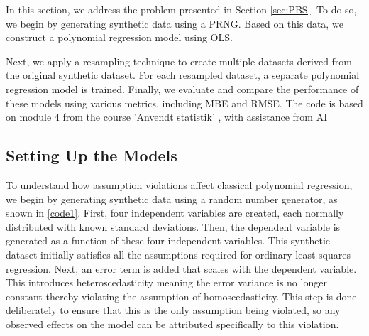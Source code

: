 


In this section, we address the problem presented in Section \ref{sec:PBS}. To do so, we begin by generating synthetic data using a PRNG. Based on this data, we construct a polynomial regression model using OLS.

\noindent Next, we apply a resampling technique to create multiple datasets derived from the original synthetic dataset. For each resampled dataset, a separate polynomial regression model is trained. Finally, we evaluate and compare the performance of these models using various metrics, including MBE and RMSE. The code is based on module 4 from the course 'Anvendt statistik' \cite{ASTA}, with assistance from AI 

\subsection{Setting Up the Models}
To understand how assumption violations affect classical polynomial regression, we begin by generating synthetic data using a random number generator, as shown in \autoref{code1}. First, four independent variables are created, each normally distributed with known standard deviations. Then, the dependent variable is generated as a function of these four independent variables. This synthetic dataset initially satisfies all the assumptions required for ordinary least squares regression. Next, an error term is added that scales with the dependent variable. This introduces heteroscedasticity meaning the error variance is no longer constant thereby violating the assumption of homoscedasticity. This step is done deliberately to ensure that this is the only assumption being violated, so any observed effects on the model can be attributed specifically to this violation.
\\\\


